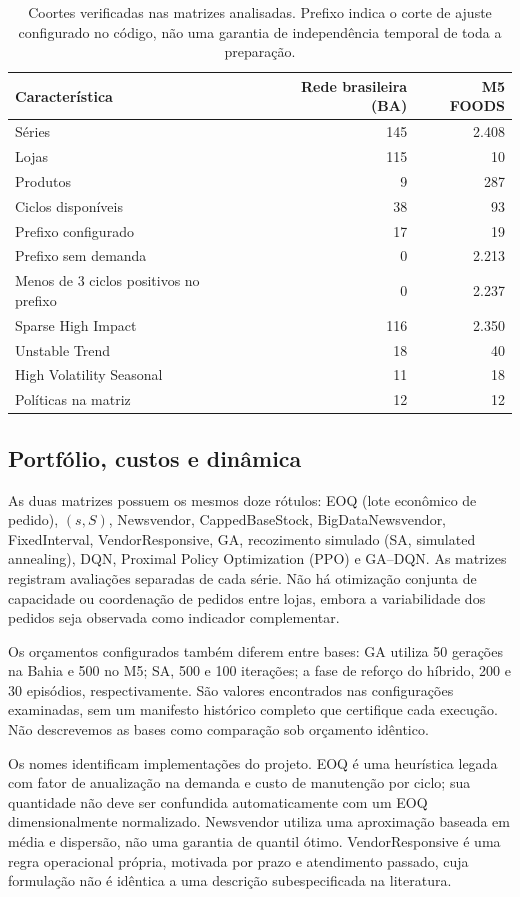 \documentclass[preprint,12pt]{elsarticle}
\begin{document}
\begin{table}[htbp]
\centering\small
\caption{Coortes verificadas nas matrizes analisadas. Prefixo indica o corte de ajuste configurado no código, não uma garantia de independência temporal de toda a preparação.}\label{tab:cohort}
\begin{tabular}{lrr}
\toprule
Característica & Rede brasileira (BA) & M5 FOODS\\
\midrule
Séries & 145 & 2.408\\
Lojas & 115 & 10\\
Produtos & 9 & 287\\
Ciclos disponíveis & 38 & 93\\
Prefixo configurado & 17 & 19\\
Prefixo sem demanda & 0 & 2.213\\
Menos de 3 ciclos positivos no prefixo & 0 & 2.237\\
Sparse High Impact & 116 & 2.350\\
Unstable Trend & 18 & 40\\
High Volatility Seasonal & 11 & 18\\
Políticas na matriz & 12 & 12\\
\bottomrule
\end{tabular}
\end{table}

\subsection{Portfólio, custos e dinâmica}
As duas matrizes possuem os mesmos doze rótulos: EOQ (lote econômico de pedido), $(s,S)$, Newsvendor, CappedBaseStock, BigDataNewsvendor, FixedInterval, VendorResponsive, GA, recozimento simulado (SA, simulated annealing), DQN, Proximal Policy Optimization (PPO) e GA--DQN. As matrizes registram avaliações separadas de cada série. Não há otimização conjunta de capacidade ou coordenação de pedidos entre lojas, embora a variabilidade dos pedidos seja observada como indicador complementar.

Os orçamentos configurados também diferem entre bases: GA utiliza 50 gerações na Bahia e 500 no M5; SA, 500 e 100 iterações; a fase de reforço do híbrido, 200 e 30 episódios, respectivamente. São valores encontrados nas configurações examinadas, sem um manifesto histórico completo que certifique cada execução. Não descrevemos as bases como comparação sob orçamento idêntico.

Os nomes identificam implementações do projeto. EOQ é uma heurística legada com fator de anualização na demanda e custo de manutenção por ciclo; sua quantidade não deve ser confundida automaticamente com um EOQ dimensionalmente normalizado. Newsvendor utiliza uma aproximação baseada em média e dispersão, não uma garantia de quantil ótimo. VendorResponsive é uma regra operacional própria, motivada por prazo e atendimento passado, cuja formulação não é idêntica a uma descrição subespecificada na literatura.
\end{document}
